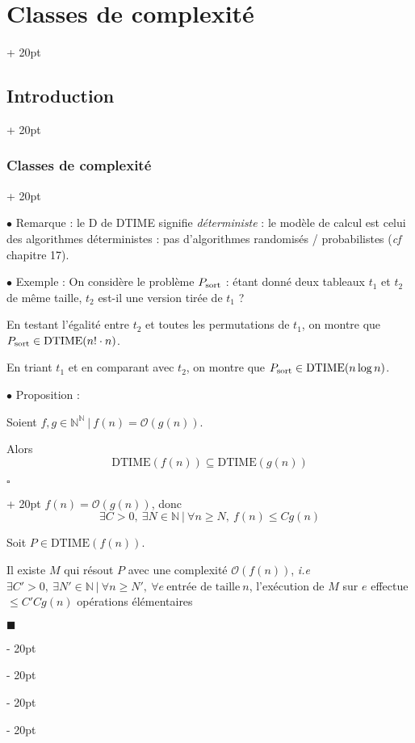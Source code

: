 \documentclass[a4paper, 12pt, twoside]{article}
\newcommand{\N}{\mathbb{N}} %
\renewcommand{\le}{\leqslant}
\renewcommand{\ge}{\geqslant}
\newcommand{\ind}[1][20pt]{\advance\leftskip + #1}
\newcommand{\deind}[1][20pt]{\advance\leftskip - #1}
\newenvironment{indt}[2][20pt]{#2 \par \ind[#1]}{\par \deind} %
\newenvironment{proof}[1][{}]{\begin{indt}{$\square$ #1}}{$\blacksquare$ \end{indt}}
\begin{document}
\begin{indt}{\section{Classes de complexité}}
\begin{indt}{\subsection{Introduction}}
\begin{indt}{\subsubsection{Classes de complexité}}
                \vspace{12pt}
                
                $\bullet$ Remarque : le D de DTIME signifie \emph{déterministe} : le modèle de calcul est celui des algorithmes déterministes : pas d'algorithmes randomisés / probabilistes (\textit{cf} chapitre 17).

                \vspace{12pt}
                
                $\bullet$ Exemple : On considère le problème $P_{\rm sort}$ : étant donné deux tableaux $t_1$ et $t_2$ de même taille, $t_2$ est-il une version tirée de $t_1$ ?

                En testant l'égalité entre $t_2$ et toutes les permutations de $t_1$, on montre que $P_{\rm sort} \in \mathrm{DTIME}(n! \cdot n)$.

                En triant $t_1$ et en comparant avec $t_2$, on montre que $P_{\rm sort} \in \mathrm{DTIME}(n \log n)$.

                \vspace{12pt}
                
                $\bullet$ Proposition :
                \begin{emphBox}
                    Soient $f, g \in \N^\N\ |\ f(n) = \mathcal O(g(n))$.

                    Alors
                    \[
                        \mathrm{DTIME}(f(n)) \subseteq \mathrm{DTIME}(g(n))
                    \]
                \end{emphBox}

                \vspace{6pt}
                
                \begin{proof}
                    $f(n) = \mathcal O(g(n))$, donc
                    \[
                        \exists C > 0,\ \exists N \in \N\ |\
                        \forall n \ge N,\
                        f(n) \le C g(n)
                    \]

                    Soit $P \in \mathrm{DTIME}(f(n))$.

                    Il existe $M$ qui résout $P$ avec une complexité $\mathcal O(f(n))$, \textit{i.e}
                    $
                        \exists C' > 0,\ \exists N' \in \N\ |\
                        \forall n \ge N',\
                        \forall e\ \text{entrée de taille}\ n
                    $,
                    l'exécution de $M$ sur $e$ effectue $\le C'C g(n)$ opérations élémentaires


\end{proof}
\end{indt}
\end{indt}
\end{indt}
\end{document}
